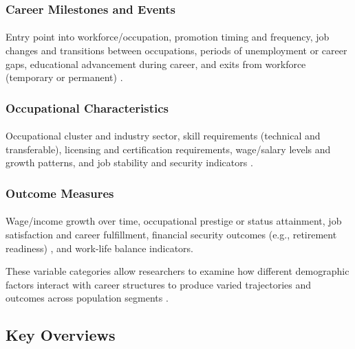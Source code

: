 \documentclass[../main.tex]{subfiles}
\begin{document}
\subsubsection{Career Milestones and Events}
\paragraph{} Entry point into workforce/occupation, promotion timing and frequency, job changes and transitions between occupations, periods of unemployment or career gaps, educational advancement during career, and exits from workforce (temporary or permanent) \citep{nataraj2018career}.

\subsubsection{Occupational Characteristics}
\paragraph{} Occupational cluster and industry sector, skill requirements (technical and transferable), licensing and certification requirements, wage/salary levels and growth patterns, and job stability and security indicators \citep{dol2023building}.

\subsubsection{Outcome Measures}
\paragraph{} Wage/income growth over time, occupational prestige or status attainment, job satisfaction and career fulfillment, financial security outcomes (e.g., retirement readiness) \citep{lee2023middle}, and work-life balance indicators.

These variable categories allow researchers to examine how different demographic factors interact with career structures to produce varied trajectories and outcomes across population segments \citep{questionpro2024demographic}.

\subsection{Key Overviews}
\end{document}
